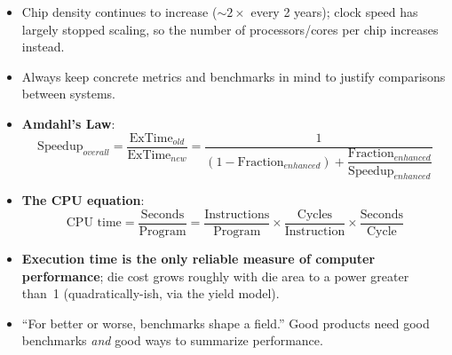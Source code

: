 \begin{itemize}[leftmargin=*]
  \item Chip density continues to increase ($\sim2\times$ every 2 years);
  clock speed has largely stopped scaling, so the number of
  processors/cores per chip increases instead.
  \item Always keep concrete metrics and benchmarks in mind to justify
  comparisons between systems.
  \item \textbf{Amdahl's Law}:
  \[
    \text{Speedup}_{overall} = \frac{\text{ExTime}_{old}}{\text{ExTime}_{new}}
    = \frac{1}{(1-\text{Fraction}_{enhanced}) +
    \dfrac{\text{Fraction}_{enhanced}}{\text{Speedup}_{enhanced}}}
  \]
  \item \textbf{The CPU equation}:
  \[
    \text{CPU time} = \frac{\text{Seconds}}{\text{Program}} =
    \frac{\text{Instructions}}{\text{Program}} \times
    \frac{\text{Cycles}}{\text{Instruction}} \times
    \frac{\text{Seconds}}{\text{Cycle}}
  \]
  \item \textbf{Execution time is the only reliable measure of computer
  performance}; die cost grows roughly with die area to a power greater
  than~1 (quadratically-ish, via the yield model).
  \item ``For better or worse, benchmarks shape a field.'' Good products
  need good benchmarks \emph{and} good ways to summarize performance.
\end{itemize}

